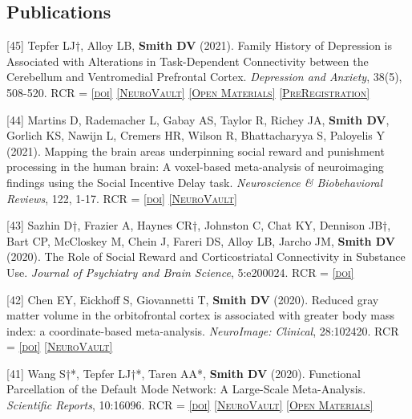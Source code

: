 \documentclass[11pt, letterpaper]{article}
\newcommand{\doi}[1]{\href{#1}{\scriptsize\textsc{[doi]}}} %
\newcommand{\neurovault}[1]{\href{#1}{\scriptsize\textsc{[NeuroVault]}}}
\newcommand{\materials}[1]{\href{#1}{\scriptsize\textsc{[Open Materials]}}}
\newcommand{\preregistration}[1]{\href{#1}{\scriptsize\textsc{[PreRegistration]}}}
\begin{document}
\subsection*{Publications}

\begin{hangparas}{.5in}{1}

[45] Tepfer LJ†, Alloy LB, \textbf{Smith DV} (2021). Family History of Depression is Associated with Alterations in Task-Dependent Connectivity between the Cerebellum and Ventromedial Prefrontal Cortex. \textit{Depression and Anxiety},  38(5), 508-520. RCR =  \doi{https://doi.org/10.1002/da.23143} \neurovault{https://neurovault.org/collections/6130/} \materials{https://osf.io/ju32v/} \preregistration{http://aspredicted.org/blind.php?x=8qw2h3}

[44] Martins D, Rademacher L, Gabay AS, Taylor R, Richey JA, \textbf{Smith DV}, Gorlich KS, Nawijn L, Cremers HR, Wilson R, Bhattacharyya S, Paloyelis Y (2021). Mapping the brain areas underpinning social reward and punishment processing in the human brain: A voxel-based meta-analysis of neuroimaging findings using the Social Incentive Delay task. \textit{Neuroscience \& Biobehavioral Reviews}, 122, 1-17. RCR =  \doi{https://doi.org/10.1016/j.neubiorev.2020.12.034} \neurovault{https://neurovault.org/collections/7793}

[43] Sazhin D†, Frazier A, Haynes CR†, Johnston C, Chat KY, Dennison JB†, Bart CP, McCloskey M, Chein J, Fareri DS, Alloy LB, Jarcho JM, \textbf{Smith DV} (2020). The Role of Social Reward and Corticostriatal Connectivity in Substance Use. \textit{Journal of Psychiatry and Brain Science}, 5:e200024. RCR =  \doi{https://doi.org/10.20900/jpbs.20200024} %

[42] Chen EY, Eickhoff S, Giovannetti T, \textbf{Smith DV} (2020). Reduced gray matter volume in the orbitofrontal cortex is associated with greater body mass index: a coordinate-based meta-analysis. \textit{NeuroImage: Clinical}, 28:102420. RCR =  \doi{https://doi.org/10.1016/j.nicl.2020.102420} \neurovault{https://neurovault.org/collections/8703/} 

[41] Wang S†*, Tepfer LJ†*, Taren AA*, \textbf{Smith DV} (2020). Functional Parcellation of the Default Mode Network: A Large-Scale Meta-Analysis. \textit{Scientific Reports}, 10:16096. RCR =  \doi{https://doi.org/10.1038/s41598-020-72317-8} \neurovault{https://identifiers.org/neurovault.collection:6262} \materials{https://zenodo.org/record/3599989\#.Xl2u4y2ZPOQ} 


\end{hangparas}
\end{document}
